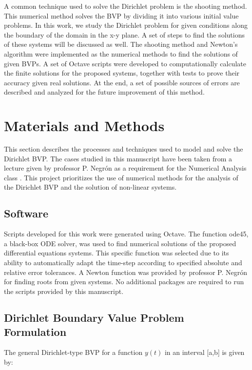 \documentclass{article}
\begin{document}
A common technique used to solve the Dirichlet problem is the shooting method. This numerical method solves the BVP by dividing it into various initial value problems. In this work, we study the Dirichlet problem for given conditions along the boundary of the domain in the x-y plane. A set of steps to find the solutions of these systems will be discussed as well. The shooting method and Newton's algorithm were implemented as the numerical methods to find the solutions of given BVPs. A set of Octave scripts were developed to computationally calculate the finite solutions for the proposed systems, together with tests to prove their accuracy given real solutions. At the end, a set of possible sources of errors are described and analyzed for the future improvement of this method.

\section{Materials and Methods}

This section describes the processes and techniques used to model and solve the Dirichlet BVP. The cases studied in this manuscript have been taken from a lecture given by professor P. Negr\'{o}n as a requirement for the Numerical Analysis class \cite{Negron}. This project prioritizes the use of numerical methods for the analysis of the Dirichlet BVP and the solution of non-linear systems.

\subsection{Software}

Scripts developed for this work were generated using Octave. The function ode45, a black-box ODE solver, was used to find numerical solutions of the proposed differential equations systems. This specific function was selected due to its ability to automatically adapt the time-step according to specified absolute and relative error tolerances. A Newton function was provided by professor P. Negr\'{o}n for finding roots from given systems. No additional packages are required to run the scripts provided by this manuscript.

\subsection{Dirichlet Boundary Value Problem Formulation}

The general Dirichlet-type BVP for a function $y(t)$ in an interval [a,b] is given by:
\end{document}
